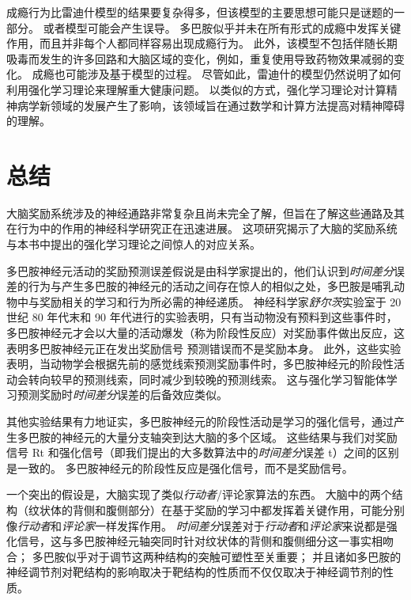 成瘾行为比雷迪什模型的结果要复杂得多，但该模型的主要思想可能只是谜题的一部分。
或者模型可能会产生误导。
多巴胺似乎并未在所有形式的成瘾中发挥关键作用，而且并非每个人都同样容易出现成瘾行为。
此外，该模型不包括伴随长期吸毒而发生的许多回路和大脑区域的变化，例如，重复使用导致药物效果减弱的变化。
成瘾也可能涉及基于模型的过程。
尽管如此，雷迪什的模型仍然说明了如何利用强化学习理论来理解重大健康问题。
以类似的方式，强化学习理论对计算精神病学新领域的发展产生了影响，该领域旨在通过数学和计算方法提高对精神障碍的理解。


\section{总结}

大脑奖励系统涉及的神经通路非常复杂且尚未完全了解，但旨在了解这些通路及其在行为中的作用的神经科学研究正在迅速进展。
这项研究揭示了大脑的奖励系统与本书中提出的强化学习理论之间惊人的对应关系。


多巴胺神经元活动的奖励预测误差假说是由科学家提出的，他们认识到\textit{时间差分}误差的行为与产生多巴胺的神经元的活动之间存在惊人的相似之处，多巴胺是哺乳动物中与奖励相关的学习和行为所必需的神经递质。
神经科学家\textit{舒尔茨}实验室于 20 世纪 80 年代末和 90 年代进行的实验表明，只有当动物没有预料到这些事件时，多巴胺神经元才会以大量的活动爆发（称为阶段性反应）对奖励事件做出反应，这表明多巴胺神经元正在发出奖励信号 预测错误而不是奖励本身。
此外，这些实验表明，当动物学会根据先前的感觉线索预测奖励事件时，多巴胺神经元的阶段性活动会转向较早的预测线索，同时减少到较晚的预测线索。
这与强化学习智能体学习预测奖励时\textit{时间差分}误差的后备效应类似。


其他实验结果有力地证实，多巴胺神经元的阶段性活动是学习的强化信号，通过产生多巴胺的神经元的大量分支轴突到达大脑的多个区域。
这些结果与我们对奖励信号 Rt 和强化信号（即我们提出的大多数算法中的\textit{时间差分}误差 t）之间的区别是一致的。
多巴胺神经元的阶段性反应是强化信号，而不是奖励信号。


一个突出的假设是，大脑实现了类似\textit{行动者}/评论家算法的东西。
大脑中的两个结构（纹状体的背侧和腹侧部分）在基于奖励的学习中都发挥着关键作用，可能分别像\textit{行动者}和\textit{评论家}一样发挥作用。
\textit{时间差分}误差对于\textit{行动者}和\textit{评论家}来说都是强化信号，这与多巴胺神经元轴突同时针对纹状体的背侧和腹侧细分这一事实相吻合；
多巴胺似乎对于调节这两种结构的突触可塑性至关重要；
并且诸如多巴胺的神经调节剂对靶结构的影响取决于靶结构的性质而不仅仅取决于神经调节剂的性质。


